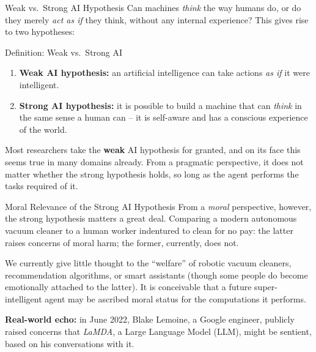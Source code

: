 \documentclass[aspectratio=169,10pt]{beamer}
\begin{document}
\begin{frame}{Weak vs.\ Strong AI Hypothesis}
  Can machines \emph{think} the way humans do, or do they merely
  \emph{act as if} they think, without any internal experience? This gives
  rise to two hypotheses:

  \begin{block}{Definition: Weak vs.\ Strong AI}
    \begin{enumerate}
      \item \textbf{Weak AI hypothesis:} an artificial intelligence can take
        actions \emph{as if} it were intelligent.
      \item \textbf{Strong AI hypothesis:} it is possible to build a machine
        that can \emph{think} in the same sense a human can -- it is
        self-aware and has a conscious experience of the world.
      \end{enumerate}
  \end{block}

  Most researchers take the \textbf{weak} AI hypothesis for granted, and on
  its face this seems true in many domains already. From a pragmatic
  perspective, it does not matter whether the strong hypothesis holds, so
  long as the agent performs the tasks required of it.
\end{frame}

\begin{frame}{Moral Relevance of the Strong AI Hypothesis}
  From a \emph{moral} perspective, however, the strong hypothesis matters a
  great deal. Comparing a modern autonomous vacuum cleaner to a human worker
  indentured to clean for no pay: the latter raises concerns of moral harm;
  the former, currently, does not.

  \vspace{0.3em}
  We currently give little thought to the ``welfare'' of robotic vacuum
  cleaners, recommendation algorithms, or smart assistants (though some
  people do become emotionally attached to the latter). It is conceivable
  that a future super-intelligent agent may be ascribed moral status for
  the computations it performs.

  \vspace{0.3em}
  \textbf{Real-world echo:} in June 2022, Blake Lemoine, a Google engineer,
  publicly raised concerns that \emph{LaMDA}, a Large Language Model (LLM),
  might be sentient, based on his conversations with it.
\end{frame}
\end{document}
